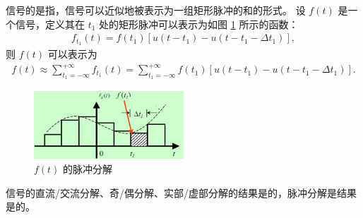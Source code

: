 \begin{definition}[信号的脉冲分解]
    信号的是指，信号可以近似地被表示为一组矩形脉冲的和的形式。
    设 $f(t)$ 是一个信号，定义其在 $t_1$ 处的矩形脉冲可以表示为如图 \ref{fig:rect-pulse-decomposition} 所示的函数：
    \begin{align*}
        f_{t_1}(t) = f(t_1)[u(t - t_1) - u(t - t_1 - \Delta t_1)],
    \end{align*}
    则 $f(t)$ 可以表示为
    \begin{align*}
        f(t) \approx \sum_{t_1 = -\infty}^{+\infty}f_{t_1}(t)
            = \sum_{t_1 = -\infty}^{+\infty}f(t_1)[u(t - t_1) - u(t - t_1 - \Delta t_1)].
    \end{align*}
    \begin{figure}[H]
        \centering
        \includegraphics[width=0.5\textwidth]{chap2/img/rect-pulse-decomposition}
        \caption{$f(t)$ 的脉冲分解}
        \label{fig:rect-pulse-decomposition}
    \end{figure}
\end{definition}

\begin{note}
    信号的直流/交流分解、奇/偶分解、实部/虚部分解的结果是的，脉冲分解是结果是的。
\end{note}

